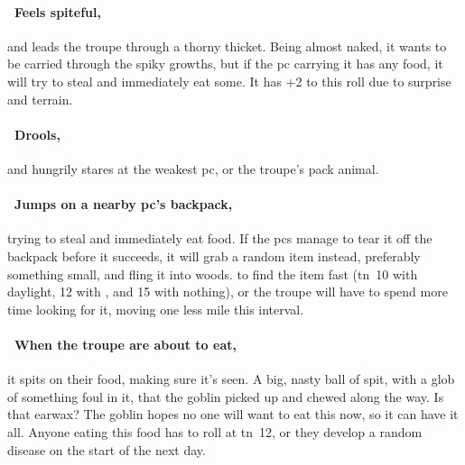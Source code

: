 \documentclass[10pt,twoside]{book}
\begin{document}
\paragraph{\Square~Feels spiteful,}
and leads the troupe through a thorny thicket.%
Being almost naked, it wants to be carried through the spiky growths, but if the \gls{pc} carrying it has any food, it will try to steal and immediately eat some.
It has +2 to this roll due to surprise and terrain.


\paragraph{\Square~Drools,}
and hungrily stares at the weakest \gls{pc}, or the troupe's pack animal.

\paragraph{\Square~Jumps on a nearby \gls{pc}'s backpack,}
trying to steal and immediately eat food.
If the \glspl{pc} manage to tear it off the backpack before it succeeds, it will grab a random item instead, preferably something small, and fling it into woods.
 to find the item fast (\gls{tn}~10 with daylight, 12 with , and 15 with nothing), or the troupe will have to spend more time looking for it, moving one less mile this \gls{interval}.

\paragraph{\Square~When the troupe are about to eat,}
it spits on their food, making sure it's seen.
A big, nasty ball of spit, with a glob of something foul in it, that the goblin picked up and chewed along the way.
Is that earwax?
The goblin hopes no one will want to eat this now, so it can have it all.
Anyone eating this food has to roll  at \gls{tn}~12, or they develop a random disease%
on the start of the next day.
\end{document}
